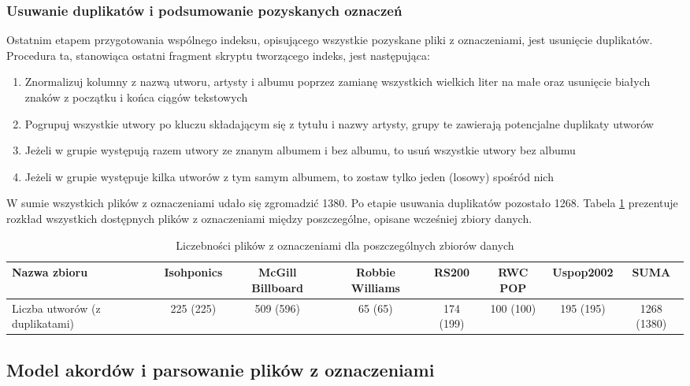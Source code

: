 \subsubsection{Usuwanie duplikatów i podsumowanie pozyskanych oznaczeń}

Ostatnim etapem przygotowania wspólnego indeksu, opisującego wszystkie pozyskane pliki z
oznaczeniami, jest usunięcie duplikatów. Procedura ta, stanowiąca ostatni fragment skryptu
tworzącego indeks, jest następująca:

\begin{enumerate}
    \item Znormalizuj kolumny z nazwą utworu, artysty i albumu poprzez zamianę wszystkich wielkich
        liter na małe oraz usunięcie białych znaków z początku i końca ciągów tekstowych
    \item Pogrupuj wszystkie utwory po kluczu składającym się z tytułu i nazwy artysty, grupy te
        zawierają potencjalne duplikaty utworów
    \item Jeżeli w grupie występują razem utwory ze znanym albumem i bez albumu, to usuń wszystkie
        utwory bez albumu
    \item Jeżeli w grupie występuje kilka utworów z tym samym albumem, to zostaw tylko jeden
        (losowy) spośród nich
\end{enumerate}

W sumie wszystkich plików z oznaczeniami udało się zgromadzić 1380. Po etapie usuwania duplikatów
pozostało 1268. Tabela \ref{tab:datasets1} prezentuje rozkład wszystkich dostępnych plików z
oznaczeniami między poszczególne, opisane wcześniej zbiory danych.

\begin{table}
    \caption{Liczebności plików z oznaczeniami dla poszczególnych zbiorów danych}
    \label{tab:datasets1}
    \begin{tabular}{|l|c|c|c|c|c|c|c|} \hline
        Nazwa zbioru & Isohponics & McGill Billboard & Robbie Williams & RS200 & RWC POP & Uspop2002 & SUMA \\ \hline
        Liczba utworów (z duplikatami) & 225 (225) & 509 (596) & 65 (65) & 174 (199) & 100 (100) & 195 (195) & 1268 (1380) \\ \hline
    \end{tabular}
\end{table}


\subsection{Model akordów i parsowanie plików z oznaczeniami}

